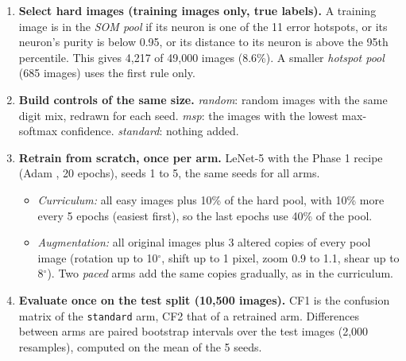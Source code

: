 \documentclass[11pt]{article}
\begin{document}
\begin{enumerate}[leftmargin=1.6em, itemsep=1pt]
  \item \textbf{Select hard images (training images only, true labels).} A training image is in the \emph{SOM pool} if its neuron is one of the 11 error hotspots, or its neuron's purity is below 0.95, or its distance to its neuron is above the 95th percentile. This gives 4{,}217 of 49{,}000 images (8.6\%). A smaller \emph{hotspot pool} (685 images) uses the first rule only.
  \item \textbf{Build controls of the same size.} \emph{random}: random images with the same digit mix, redrawn for each seed. \emph{msp}: the images with the lowest max-softmax confidence. \emph{standard}: nothing added.
  \item \textbf{Retrain from scratch, once per arm.} LeNet-5 \parencite{lecun1998gradient} with the Phase 1 recipe (Adam \parencite{kingma2015adam}, 20 epochs), seeds 1 to 5, the same seeds for all arms.
  \begin{itemize}[leftmargin=1.2em, itemsep=0pt]
    \item \emph{Curriculum:} all easy images plus 10\% of the hard pool, with 10\% more every 5 epochs (easiest first), so the last epochs use 40\% of the pool.
    \item \emph{Augmentation:} all original images plus 3 altered copies of every pool image (rotation up to 10$^\circ$, shift up to 1 pixel, zoom 0.9 to 1.1, shear up to 8$^\circ$). Two \emph{paced} arms add the same copies gradually, as in the curriculum.
  \end{itemize}
  \item \textbf{Evaluate once on the test split (10{,}500 images).} CF1 is the confusion matrix of the \texttt{standard} arm, CF2 that of a retrained arm. Differences between arms are paired bootstrap intervals over the test images (2{,}000 resamples), computed on the mean of the 5 seeds.
\end{enumerate}
\end{document}
